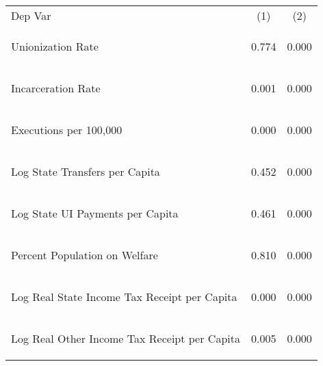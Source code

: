 \begin{center}
\begin{tabular}{lcc}
\hline \noalign{\smallskip}Dep Var & (1) & (2)\\
\noalign{\smallskip}\hline \noalign{\smallskip}Unionization Rate & \begin{scriptsize}0.774\end{scriptsize} & \begin{scriptsize}0.000\end{scriptsize}\\
Incarceration Rate & \begin{scriptsize}0.001\end{scriptsize} & \begin{scriptsize}0.000\end{scriptsize}\\
Executions per 100,000 & \begin{scriptsize}0.000\end{scriptsize} & \begin{scriptsize}0.000\end{scriptsize}\\
Log State Transfers per Capita & \begin{scriptsize}0.452\end{scriptsize} & \begin{scriptsize}0.000\end{scriptsize}\\
Log State UI Payments per Capita & \begin{scriptsize}0.461\end{scriptsize} & \begin{scriptsize}0.000\end{scriptsize}\\
Percent Population on Welfare & \begin{scriptsize}0.810\end{scriptsize} & \begin{scriptsize}0.000\end{scriptsize}\\
Log Real State Income Tax Receipt per Capita & \begin{scriptsize}0.000\end{scriptsize} & \begin{scriptsize}0.000\end{scriptsize}\\
Log Real Other Income Tax Receipt per Capita & \begin{scriptsize}0.005\end{scriptsize} & \begin{scriptsize}0.000\end{scriptsize}\\

\end{tabular}
\end{center}
